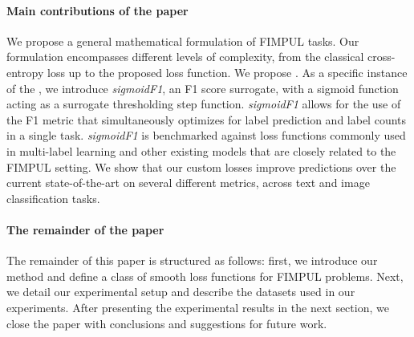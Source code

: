 \paragraph{Main contributions of the paper}
We propose a general mathematical formulation of FIMPUL tasks.
Our formulation encompasses different levels of complexity, from the classical cross-entropy loss up to the proposed loss function. We propose \solution. As a specific instance of the \solution, we introduce \emph{sigmoidF1}, an F1 score surrogate, with a sigmoid function acting as a surrogate thresholding step function.
\emph{sigmoidF1} allows for the use of the F1 metric that simultaneously optimizes for label prediction and label counts in a single task.
\emph{sigmoidF1} is benchmarked against loss functions commonly used in multi-label learning and other existing models that are closely related to the FIMPUL setting. We show that our custom losses improve predictions over the current state-of-the-art on several different metrics, across text and image classification tasks.

\paragraph{The remainder of the paper}
The remainder of this paper is structured as follows: first, we introduce our method and define a class of smooth loss functions for FIMPUL problems. Next, we detail our experimental setup and describe the datasets used in our experiments. After presenting the experimental results in the next section, we close the paper with conclusions and suggestions for future work.



